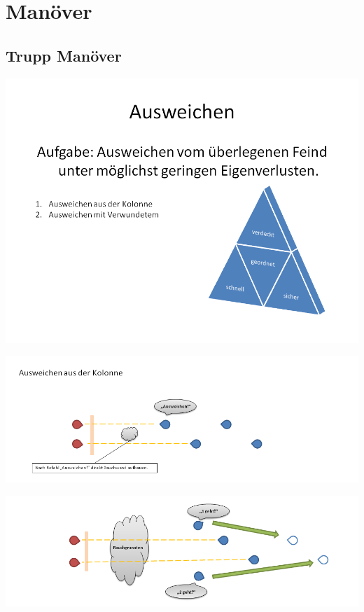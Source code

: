 \newpage
\section{Manöver}
\subsection{Trupp Manöver}

\begin{minipage}[t]{1\textwidth}
\includegraphics[width=\textwidth]{./Grafiken/Abschnitt/Ausweichen_teaser.png}
\end{minipage}

\begin{minipage}[t]{1\textwidth}
\includegraphics[width=\textwidth]{./Grafiken/Abschnitt/Ausweichen_aus_Kolonne.png}
\end{minipage}

\begin{minipage}[t]{1\textwidth}
\includegraphics[width=\textwidth]{./Grafiken/Abschnitt/Ausweichen_aus_Kolonne_2.png}
\end{minipage}

